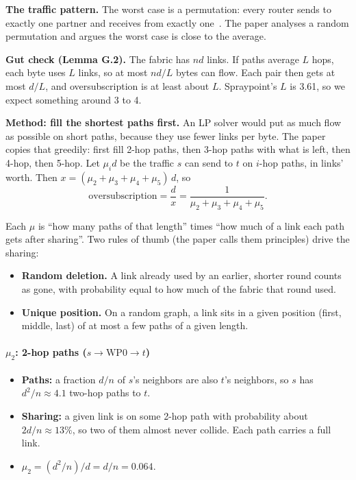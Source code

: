 \textbf{The traffic pattern.} The worst case is a permutation: every router sends to exactly one partner and receives from exactly one~\cite{namyar}. The paper analyses a random permutation and argues the worst case is close to the average.

\textbf{Gut check (Lemma G.2).} The fabric has $n d$ links. If paths average $L$ hops, each byte uses $L$ links, so at most $n d / L$ bytes can flow. Each pair then gets at most $d / L$, and oversubscription is at least about $L$. Spraypoint's $L$ is 3.61, so we expect something around 3 to 4.

\textbf{Method: fill the shortest paths first.} An LP solver would put as much flow as possible on short paths, because they use fewer links per byte. The paper copies that greedily: first fill 2-hop paths, then 3-hop paths with what is left, then 4-hop, then 5-hop. Let $\mu_i d$ be the traffic $s$ can send to $t$ on $i$-hop paths, in links' worth. Then $x = (\mu_2 + \mu_3 + \mu_4 + \mu_5)\, d$, so
\[
\text{oversubscription} = \frac{d}{x} = \frac{1}{\mu_2 + \mu_3 + \mu_4 + \mu_5}.
\]

Each $\mu$ is ``how many paths of that length'' times ``how much of a link each path gets after sharing''. Two rules of thumb (the paper calls them principles) drive the sharing:
\begin{itemize}
  \item \textbf{Random deletion.} A link already used by an earlier, shorter round counts as gone, with probability equal to how much of the fabric that round used.
  \item \textbf{Unique position.} On a random graph, a link sits in a given position (first, middle, last) of at most a few paths of a given length.
\end{itemize}

\paragraph{$\mu_2$: 2-hop paths ($s \to \text{WP0} \to t$)}

\begin{itemize}
  \item \textbf{Paths:} a fraction $d/n$ of $s$'s neighbors are also $t$'s neighbors, so $s$ has $d^2/n \approx 4.1$ two-hop paths to $t$.
  \item \textbf{Sharing:} a given link is on some 2-hop path with probability about $2d/n \approx 13\%$, so two of them almost never collide. Each path carries a full link.
  \item $\mu_2 = (d^2/n) / d = d/n = \mathbf{0.064}$.
\end{itemize}

